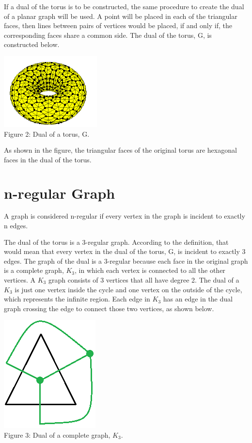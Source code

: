 \documentclass[12pt]{article}
\begin{document}
\begin{flushleft}
\medskip
If a dual of the torus is to be constructed, the same procedure to create the dual of a planar graph will be used. A point will be placed in each of the triangular faces, then lines between pairs of vertices would be placed, if and only if, the corresponding faces share a common side. The dual of the torus, G, is constructed below.

\begin{center}
\includegraphics[scale=1.25]{images/torusdual.png}\\
Figure 2: Dual of a torus, G.
\end{center}

As shown in the figure, the triangular faces of the original torus are hexagonal faces in the dual of the torus.

\section*{n-regular Graph}
A graph is considered n-regular if every vertex in the graph is incident to exactly n edges.

\medskip
The dual of the torus is a 3-regular graph. According to the definition, that would mean that every vertex in the dual of the torus, G, is incident to exactly 3 edges. The graph of the dual is a 3-regular because each face in the original graph is a complete graph, $K_3$, in which each vertex is connected to all the other vertices. A $K_3$ graph consists of 3 vertices that all have degree 2. The dual of a $K_3$ is just one vertex inside the cycle and one vertex on the outside of the cycle, which represents the infinite region. Each edge in $K_3$ has an edge in the dual graph crossing the edge to connect those two vertices, as shown below.

\begin{center}
\includegraphics[scale=1]{images/k3dual.png}\\
Figure 3: Dual of a complete graph, $K_3$.
\end{center}


\end{flushleft}
\end{document}
